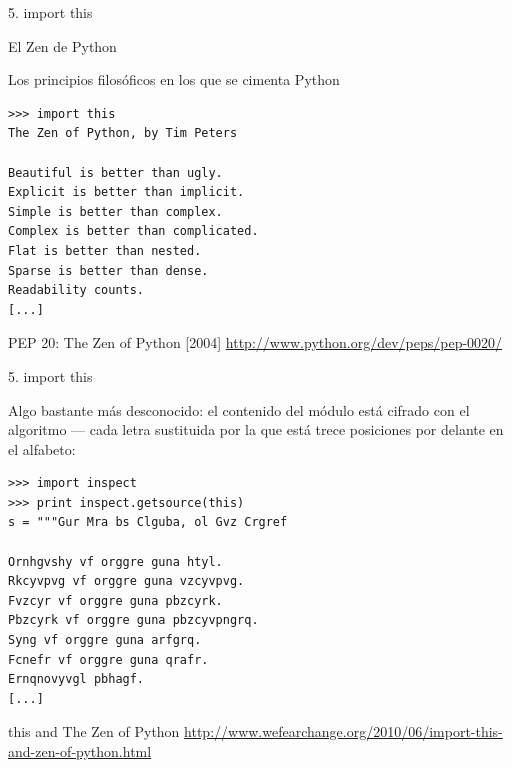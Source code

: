 \documentclass[14pt]{beamer}
\begin{document}
\begin{frame}[fragile]{5. import this}
  \Large
  \begin{block}{}
    \centering El Zen de Python
  \end{block}

  \begin{exampleblock}{\small Los principios filosóficos en los que se cimenta Python}
    \tiny
    \begin{lstlisting}
>>> import this
The Zen of Python, by Tim Peters

Beautiful is better than ugly.
Explicit is better than implicit.
Simple is better than complex.
Complex is better than complicated.
Flat is better than nested.
Sparse is better than dense.
Readability counts.
[...]
    \end{lstlisting}
  \end{exampleblock}

  \small
  \begin{block}{\centering PEP 20: The Zen of Python [2004]}
    \centering \url{http://www.python.org/dev/peps/pep-0020/}
  \end{block}
\end{frame}

\begin{frame}[fragile]{5. import this}
  \small
  \begin{center}
    Algo bastante más desconocido: el contenido del módulo
     está cifrado con el algoritmo
     --- cada letra sustituida por la que está trece
    posiciones por delante en el alfabeto:
  \end{center}

  \begin{exampleblock}{}
    \tiny
    \begin{lstlisting}
>>> import inspect
>>> print inspect.getsource(this)
s = """Gur Mra bs Clguba, ol Gvz Crgref

Ornhgvshy vf orggre guna htyl.
Rkcyvpvg vf orggre guna vzcyvpvg.
Fvzcyr vf orggre guna pbzcyrk.
Pbzcyrk vf orggre guna pbzcyvpngrq.
Syng vf orggre guna arfgrq.
Fcnefr vf orggre guna qrafr.
Ernqnovyvgl pbhagf.
[...]
    \end{lstlisting}
  \end{exampleblock}

  \scriptsize
  \begin{block}{\centering this and The Zen of Python}
    \centering
    \url{http://www.wefearchange.org/2010/06/import-this-and-zen-of-python.html}
  \end{block}
\end{frame}
\end{document}
